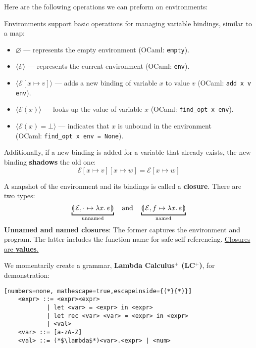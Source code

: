 \newpage
\noindent
Here are the following operations we can preform on environments:
\begin{Def}

   \label{def:env-operations}

   \noindent
   Environments support basic operations for managing variable bindings, similar to a map:

   \begin{itemize}
       \item \(\varnothing\) — represents the empty environment (OCaml: \texttt{empty}).
       \item $\langle\mathcal{E} \rangle$ — represents the current environment (OCaml: \texttt{env}).
       \item $\langle\mathcal{E}[x \mapsto v] \rangle$ — adds a new binding of variable \(x\) to value \(v\) (OCaml: \texttt{add x v env}).
       
       \item $\langle\mathcal{E}(x) \rangle$ — looks up the value of variable \(x\) (OCaml: \texttt{find\_opt x env}).
       
       \item $\langle\mathcal{E}(x) = \bot \rangle$ — indicates that \(x\) is unbound in the environment\\ (OCaml: \texttt{find\_opt x env = None}).
   \end{itemize}

   \noindent
   Additionally, if a new binding is added for a variable that already exists, the new binding \textbf{shadows} the old one:
   \[
   \mathcal{E}[x \mapsto v][x \mapsto w] = \mathcal{E}[x \mapsto w]
   \]
\end{Def}

\begin{Def}

  A snapshot of the environment and its bindings is called a \textbf{closure}. There are two types:
  \[
      \underbracket{\llp\mathcal{E}, \cdot \mapsto \lambda x.\,e\rrp}_{\text{unnamed}} \quad \text{and} \quad \underbracket{\llp \mathcal{E}, f\mapsto\lambda x.\,e\rrp}_{\text{named}}
  \]
  \textbf{Unnamed and named closures}: The former captures the environment and program. The 
  latter includes the function name for safe self-referencing. \underline{Closures are \textbf{values}.}
\end{Def}
\begin{Example}

We momentarily create a grammar, \textbf{Lambda Calculus$^+$ (LC$^+$)}, for demonstration:

\begin{lstlisting}[numbers=none, mathescape=true,escapeinside={(*}{*)}]
    <expr> ::= <expr><expr>
            | let <var> = <expr> in <expr>
            | let rec <var> <var> = <expr> in <expr>
            | <val>
    <var> ::= [a-zA-Z]
    <val> ::= (*$\lambda$*)<var>.<expr> | <num>
    \end{lstlisting}

\end{Example}        

